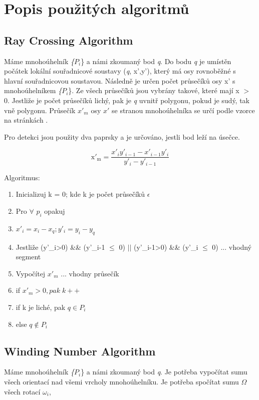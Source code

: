 \documentclass[oneside,12pt,a4paper]{book}
\begin{document}
\chapter{Popis použitých algoritmů}
\label{kapitola: Popis použitých algoritmů}

\section{Ray Crossing Algorithm}
Máme mnohoúhelník \emph\{$P_i$\} a námi zkoumaný bod \emph{q}. Do bodu \emph{q} je umístěn počátek lokální souřadnicové soustavy (\emph{q}, x',y'), který má osy rovnoběžné s hlavní souřadnicovou soustavou. Následně je určen počet průsečíků osy x' s mnohoúhelníkem \emph\{$P_i$\}. Ze všech průsečíků jsou vybrány takové, které mají  x $>$ 0. Jestliže je počet průsečíků lichý, pak je \emph{q} uvnitř polygonu, pokud je sudý, tak vně polygonu. Průsečík $x'_m$ osy $x'$ se stranou mnohoúhelníka se určí podle vzorce na stránkách \cite{plp} .\par
Pro detekci jsou použity dva paprsky a je určováno, jestli bod leží na úsečce.\par


\begin{equation}
    \mathrm{x'_m} = \frac{x'_iy'_{i-1}-x'_{i-1}y'_i}{y'_i-y'_{i-1}}
\tag{1}
\label{hh}
\end{equation}

\bigskip


Algoritmus$:$
\begin{enumerate}
\item Inicializuj k = 0; kde k je počet průsečíků $\epsilon$
\item       Pro $\forall$ $p_i$ opakuj
\item \quad \quad $x'_i = x_i -x_q;   y'_i = y_i -y_q$
\item \quad \quad Jestliže (y'_i>0) \; \&\&\;  (y'_{i-1} $\leq$ 0) $||$ (y'_{i-1}>0) \; \&\&\;  (y'_{i} $\leq$ 0) ... vhodný segment
\item \quad \quad Vypočítej $x'_m$ ... vhodny průsečík
\item \quad \quad if $x'_m > 0, pak \;  k++$
\item if k je liché, pak $q \in P_i$
\item else $q \notin P_i$
\end{enumerate}
\section{Winding Number Algorithm}
Máme mnohoúhelník \emph\{$P_i$\} a námi zkoumaný bod \emph{q}. Je potřeba vypočítat sumu všech orientací nad  všemi vrcholy mnohoúhelníku. Je potřeba spočítat sumu $\Omega$ všech rotací $\omega_i$,
\end{document}
